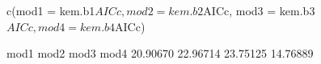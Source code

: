 \begin{Schunk}
\begin{Sinput}
 c(mod1 = kem.b1$AICc, mod2 = kem.b2$AICc, mod3 = kem.b3$AICc, mod4 = kem.b4$AICc)
\end{Sinput}
\begin{Soutput}
    mod1     mod2     mod3     mod4 
20.90670 22.96714 23.75125 14.76889 
\end{Soutput}
\end{Schunk}
